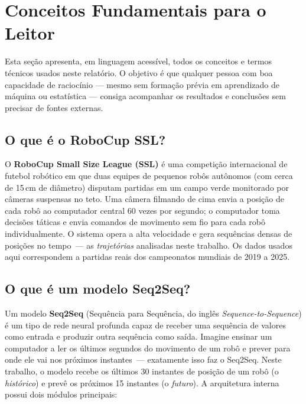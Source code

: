 \documentclass[11pt,a4paper]{article}
\begin{document}
\section*{Conceitos Fundamentais para o Leitor}


Esta se\c{c}\~ao apresenta, em linguagem acess\'ivel, todos os conceitos e termos t\'ecnicos usados neste relat\'orio. O objetivo \'e que qualquer pessoa com boa capacidade de racioc\'inio --- mesmo sem forma\c{c}\~ao pr\'evia em aprendizado de m\'aquina ou estat\'istica --- consiga acompanhar os resultados e conclus\~oes sem precisar de fontes externas.

\subsection*{O que \'e o RoboCup SSL?}

O \textbf{RoboCup Small Size League (SSL)} \'e uma competi\c{c}\~ao internacional de futebol rob\'otico em que duas equipes de pequenos rob\^os aut\^onomos (com cerca de 15\,cm de di\^ametro) disputam partidas em um campo verde monitorado por c\^ameras suspensas no teto. Uma c\^amera filmando de cima envia a posi\c{c}\~ao de cada rob\^o ao computador central 60 vezes por segundo; o computador toma decis\~oes t\'aticas e envia comandos de movimento sem fio para cada rob\^o individualmente. O sistema opera a alta velocidade e gera sequ\^encias densas de posi\c{c}\~oes no tempo~--- as \emph{trajet\'orias} analisadas neste trabalho. Os dados usados aqui correspondem a partidas reais dos campeonatos mundiais de 2019 a 2025.

\subsection*{O que \'e um modelo Seq2Seq?}

Um modelo \textbf{Seq2Seq} (Sequ\^encia para Sequ\^encia, do ingl\^es \emph{Sequence-to-Sequence}) \'e um tipo de rede neural profunda capaz de receber uma sequ\^encia de valores como entrada e produzir outra sequ\^encia como sa\'ida. Imagine ensinar um computador a ler os \'ultimos segundos do movimento de um rob\^o e prever para onde ele vai nos pr\'oximos instantes~--- exatamente isso faz o Seq2Seq. Neste trabalho, o modelo recebe os \'ultimos 30 instantes de posi\c{c}\~ao de um rob\^o (o \emph{hist\'orico}) e prev\^e os pr\'oximos 15 instantes (o \emph{futuro}). A arquitetura interna possui dois m\'odulos principais:
\end{document}
